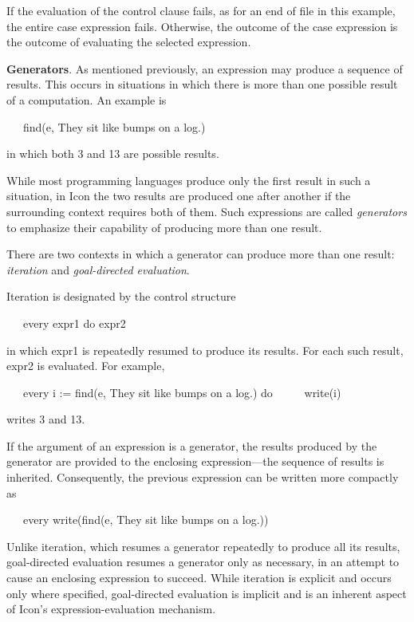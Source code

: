 If the evaluation of the control clause fails, as for an end of file in this example, the entire case expression fails.
Otherwise, the outcome of the case expression is the outcome of evaluating the selected expression.


\textbf{Generators}. As mentioned previously, an expression may
produce a sequence of results. This occurs in situations in which
there is more than one possible result of a computation. An example is

{\ttfamily\mdseries
\ \ \ find({\textquotedbl}e{\textquotedbl}, {\textquotedbl}They sit like bumps on a log.{\textquotedbl})}

\noindent in which both 3 and 13 are possible results.

While most programming languages produce only the first result in such
a situation, in Icon the two results are produced one after another if
the surrounding context requires both of them. Such expressions are
called \textit{generators} to emphasize their capability of producing
more than one result.

There are two contexts in which a generator can produce more than one
result: \textit{iteration} and \textit{goal-directed evaluation}.

Iteration is designated by the control structure

{\ttfamily\mdseries
\ \ \ every expr1 do expr2}

\noindent in which expr1 is repeatedly resumed to produce its
results. For each such result, expr2 is evaluated. For example,

{\ttfamily\mdseries
\ \ \ every i := find({\textquotedbl}e{\textquotedbl}, {\textquotedbl}They sit like bumps on a log.{\textquotedbl})
do\newline
 \ \ \ \ \ write(i)}

\noindent writes 3 and 13.

If the argument of an expression is a generator, the results produced
by the generator are provided to the enclosing expression{}---the
sequence of results is inherited. Consequently, the previous
expression can be written more compactly as

{\ttfamily\mdseries
\ \ \ every write(find({\textquotedbl}e{\textquotedbl}, {\textquotedbl}They sit like bumps on a log.{\textquotedbl}))}


Unlike iteration, which resumes a generator repeatedly to produce all
its results, goal-directed evaluation resumes a generator only as
necessary, in an attempt to cause an enclosing expression to
succeed. While iteration is explicit and occurs only where specified,
goal-directed evaluation is implicit and is an inherent aspect of
Icon's expression-evaluation mechanism.


